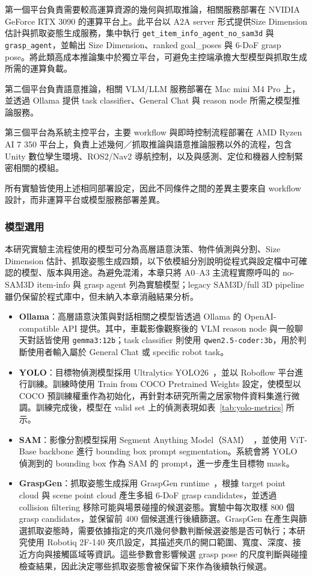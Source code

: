 \documentclass[12pt,a4paper]{article}
\begin{document}
第一個平台負責需要較高運算資源的幾何與抓取推論，相關服務部署在 NVIDIA GeForce RTX 3090 的運算平台上。此平台以 A2A server 形式提供Size Dimension 估計與抓取姿態生成服務，集中執行 \texttt{get\_item\_info\_agent\_no\_sam3d} 與 \texttt{grasp\_agent}，並輸出 Size Dimension、ranked goal\_poses 與 6-DoF grasp pose。將此類高成本推論集中於獨立平台，可避免主控端承擔大型模型與抓取生成所需的運算負載。

第二個平台負責語意推論，相關 VLM/LLM 服務部署在 Mac mini M4 Pro 上，並透過 Ollama 提供 task classifier、General Chat 與 reason node 所需之模型推論服務。

第三個平台為系統主控平台，主要 workflow 與即時控制流程部署在 AMD Ryzen AI 7 350 平台上，負責上述幾何／抓取推論與語意推論服務以外的流程，包含 Unity 數位孿生環境、ROS2/Nav2 導航控制，以及與感測、定位和機器人控制緊密相關的模組。

所有實驗皆使用上述相同部署設定，因此不同條件之間的差異主要來自 workflow 設計，而非運算平台或模型服務部署差異。
\subsubsection{模型選用}

本研究實驗主流程使用的模型可分為高層語意決策、物件偵測與分割、Size Dimension 估計、抓取姿態生成四類，以下依模組分別說明從程式與設定檔中可確認的模型、版本與用途。為避免混淆，本章只將 A0--A3 主流程實際呼叫的 no-SAM3D item-info 與 grasp agent 列為實驗模型；legacy SAM3D/full 3D pipeline 雖仍保留於程式庫中，但未納入本章消融結果分析。

\begin{itemize}
  \item \textbf{Ollama}：高層語意決策與對話相關之模型皆透過 Ollama 的 OpenAI-compatible API 提供。其中，車載影像觀察後的 VLM reason node 與一般聊天對話皆使用 \texttt{gemma3:12b}；task classifier 則使用 \texttt{qwen2.5-coder:3b}，用於判斷使用者輸入屬於 General Chat 或 specific robot task。
  \item \textbf{YOLO}：目標物偵測模型採用 Ultralytics YOLO26~\cite{ultralytics_yolo}，並以 Roboflow 平台進行訓練。訓練時使用 Train from COCO Pretrained Weights 設定，使模型以 COCO 預訓練權重作為初始化，再針對本研究所需之居家物件資料集進行微調。訓練完成後，模型在 valid set 上的偵測表現如表~\ref{tab:yolo-metrics} 所示。
  \item \textbf{SAM}：影像分割模型採用 Segment Anything Model（SAM）~\cite{sam}，並使用 ViT-Base backbone 進行 bounding box prompt segmentation。系統會將 YOLO 偵測到的 bounding box 作為 SAM 的 prompt，進一步產生目標物 mask。
  \item \textbf{GraspGen}：抓取姿態生成採用 GraspGen runtime~\cite{graspgen}，根據 target point cloud 與 scene point cloud 產生多組 6-DoF grasp candidates，並透過 collision filtering 移除可能與場景碰撞的候選姿態。實驗中每次取樣 800 個 grasp candidates，並保留前 400 個候選進行後續篩選。GraspGen 在產生與篩選抓取姿態時，需要依據指定的夾爪幾何參數判斷候選姿態是否可執行；本研究使用 Robotiq 2F-140 夾爪設定，其描述夾爪的開口範圍、寬度、深度、接近方向與接觸區域等資訊。這些參數會影響候選 grasp pose 的尺度判斷與碰撞檢查結果，因此決定哪些抓取姿態會被保留下來作為後續執行候選。
\end{itemize}
\end{document}
